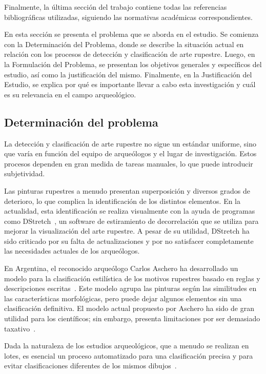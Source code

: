 Finalmente, la última sección del trabajo contiene todas las referencias bibliográficas utilizadas, siguiendo las normativas académicas correspondientes.

En esta sección se presenta el problema que se aborda en el estudio. Se comienza con la Determinación del Problema, donde se describe la situación actual en relación con los procesos de detección y clasificación de arte rupestre. Luego, en la Formulación del Problema, se presentan los objetivos generales y específicos del estudio, así como la justificación del mismo. Finalmente, en la Justificación del Estudio, se explica por qué es importante llevar a cabo esta investigación y cuál es su relevancia en el campo arqueológico.

\subsection{Determinación del problema}

La detección y clasificación de arte rupestre no sigue un estándar uniforme, sino que varía en función del equipo de arqueólogos y el lugar de investigación. Estos procesos dependen en gran medida de tareas manuales, lo que puede introducir subjetividad.

Las pinturas rupestres a menudo presentan superposición y diversos grados de deterioro, lo que complica la identificación de los distintos elementos. En la actualidad, esta identificación se realiza visualmente con la ayuda de programas como DStretch~\cite{dstretch}, un software de estiramiento de decorrelación que se utiliza para mejorar la visualización del arte rupestre. A pesar de su utilidad, DStretch ha sido criticado por su falta de actualizaciones y por no satisfacer completamente las necesidades actuales de los arqueólogos.

En Argentina, el reconocido arqueólogo Carlos Aschero ha desarrollado un modelo para la clasificación estilística de los motivos rupestres basado en reglas y descripciones escritas~\cite{aschero2012}. Este modelo agrupa las pinturas según las similitudes en las características morfológicas, pero puede dejar algunos elementos sin una clasificación definitiva. El modelo actual propuesto por Aschero ha sido de gran utilidad para los científicos; sin embargo, presenta limitaciones por ser demasiado taxativo~\cite{aschero2000}.

Dada la naturaleza de los estudios arqueológicos, que a menudo se realizan en lotes, es esencial un proceso automatizado para una clasificación precisa y para evitar clasificaciones diferentes de los mismos dibujos~\cite{aschero1998}.

